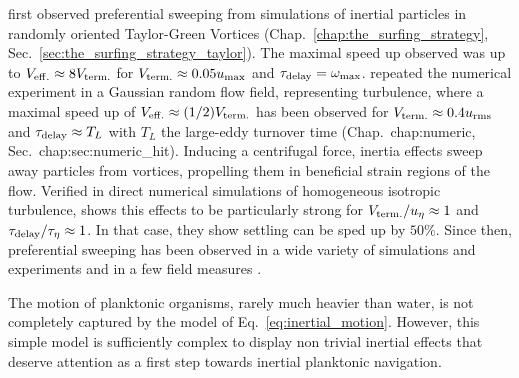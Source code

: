 \citet{maxey1986gravitational} first observed preferential sweeping from simulations of inertial particles in randomly oriented Taylor-Green Vortices (Chap.~\ref{chap:the_surfing_strategy}, Sec.~\ref{sec:the_surfing_strategy_taylor}).
The maximal speed up observed was up to $V_{\mathrm{eff.}} \approx 8 V_{\mathrm{term.}}$ for $V_{\mathrm{term.}} \approx 0.05 u_{\mathrm{max}}$ and $\tau_{\mathrm{delay}} = \omega_{\mathrm{max}}$.
\citet{maxey1987gravitational} repeated the numerical experiment in a Gaussian random flow field, representing turbulence, where a maximal speed up of $V_{\mathrm{eff.}} \approx (1/2) V_{\mathrm{term.}}$ has been observed for $V_{\mathrm{term.}} \approx 0.4 u_{\mathrm{rms}}$ and $\tau_{\mathrm{delay}} \approx T_{L}$ with $T_{L}$ the large-eddy turnover time (Chap.~{chap:numeric}, Sec.~{chap:sec:numeric_hit}).
Inducing a centrifugal force, inertia effects sweep away particles from vortices, propelling them in beneficial strain regions of the flow.
Verified in direct numerical simulations of homogeneous isotropic turbulence, \citet{wang1993settling} shows this effects to be particularly strong for $V_{\mathrm{term.}} / u_{\eta} \approx 1$ and $\tau_{\mathrm{delay}} / \tau_{\eta} \approx 1$.
In that case, they show settling can be sped up by $50\%$.
Since then, preferential sweeping has been observed in a wide variety of simulations \citep{ireland2016effect, tom2019multiscale, bragg2021mechanisms} and experiments \citep{sumbekova2017preferential, petersen2019experimental} and in a few field measures \citep{li2021evidence}.

The motion of planktonic organisms, rarely much heavier than water, is not completely captured by the model of Eq.~\eqref{eq:inertial_motion}.
However, this simple model is sufficiently complex to display non trivial inertial effects that deserve attention as a first step towards inertial planktonic navigation.

